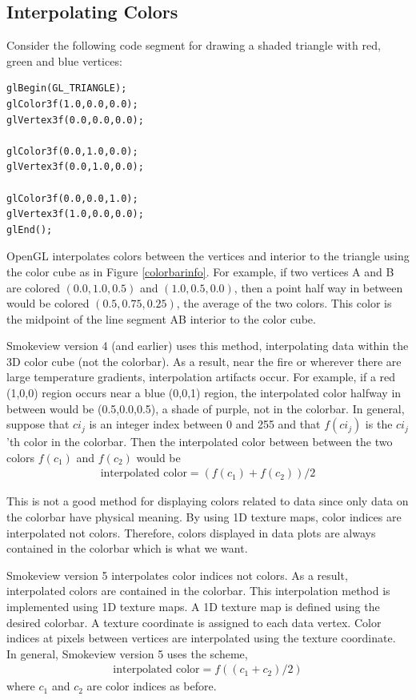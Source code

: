 \documentclass[11pt,twoside]{book}
\begin{document}
\subsection{Interpolating Colors}

Consider the following code segment for drawing a shaded triangle with red, green and blue vertices:
\begin{verbatim}
glBegin(GL_TRIANGLE);
glColor3f(1.0,0.0,0.0);
glVertex3f(0.0,0.0,0.0);

glColor3f(0.0,1.0,0.0);
glVertex3f(0.0,1.0,0.0);

glColor3f(0.0,0.0,1.0);
glVertex3f(1.0,0.0,0.0);
glEnd();
\end{verbatim}

OpenGL interpolates colors between the vertices and interior to the triangle using the color cube as in Figure \ref{colorbarinfo}.  For example, if two vertices A and B are colored $(0.0,1.0,0.5)$ and $(1.0,0.5,0.0)$, then a point half way in between would be colored $(0.5,0.75,0.25)$, the average of the two colors.  This color is the midpoint of the line segment AB interior to the color cube.

Smokeview version 4 (and earlier) uses this method, interpolating data within the 3D color cube (not the colorbar).  As a result, near the fire or wherever there are large temperature gradients, interpolation artifacts occur.  For example, if a red (1,0,0) region occurs near a blue (0,0,1) region, the interpolated color halfway in between would be (0.5,0.0,0.5), a shade of purple, not in the colorbar.  In general, suppose that $ci_j$ is an integer index between 0 and 255 and that $f(ci_j)$ is the $ci_j$'th color in the colorbar.  Then
the interpolated color between between the two colors $f(c_1)$ and $f(c_2)$ would be
\begin{eqnarray*}
\mbox{interpolated color}=(f(c_1)+f(c_2))/2
\end{eqnarray*}

This is not a good method for displaying colors related to data since only data on the colorbar have physical meaning.  By using 1D texture maps, color indices are interpolated not colors.  Therefore, colors displayed in data plots are always contained in the colorbar which is what we want.

Smokeview version 5 interpolates color indices not colors.
As a result, interpolated colors are contained in the colorbar.  This interpolation method is implemented using 1D texture maps.  A 1D texture map is defined using the desired colorbar.  A texture coordinate is assigned to each data vertex.    Color indices at pixels between vertices are interpolated using the texture coordinate.  In general, Smokeview version 5 uses the scheme,
\begin{eqnarray*}
\mbox{interpolated color}=f((c_1+c_2)/2)
\end{eqnarray*}
where $c_1$ and $c_2$ are color indices as before.
\end{document}
